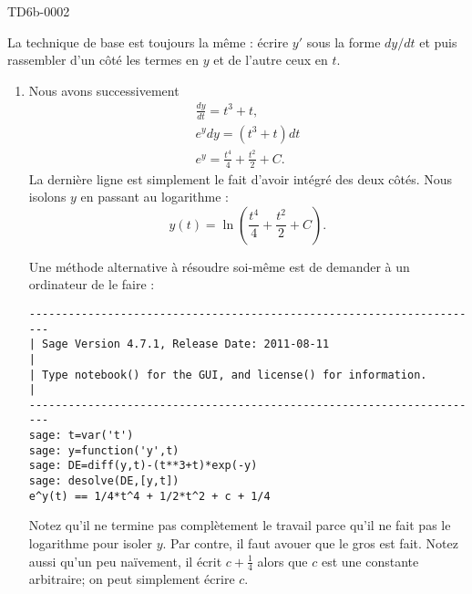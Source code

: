 
\begin{corrige}{TD6b-0002}

    La technique de base est toujours la même : écrire \( y'\) sous la forme \( dy/dt\) et puis rassembler d'un côté les termes en \( y\) et de l'autre ceux en \( t\).

    \begin{enumerate}
        \item
            

            Nous avons successivement
            \begin{subequations}
                \begin{align}
                    \frac{ dy }{ dt }=t^3+t,\\
                    e^ydy=(t^3+t)dt\\
                    e^y=\frac{ t^4 }{ 4 }+\frac{ t^2 }{2}+C.
                \end{align}
            \end{subequations}
            La dernière ligne est simplement le fait d'avoir intégré des deux côtés. Nous isolons \( y\) en passant au logarithme :
            \begin{equation}
                y(t)=\ln\left( \frac{ t^4 }{ 4 }+\frac{ t^2 }{2}+C \right).
            \end{equation}


            Une méthode alternative à résoudre soi-même est de demander à un ordinateur de le faire :
            \begin{verbatim}
----------------------------------------------------------------------
| Sage Version 4.7.1, Release Date: 2011-08-11                       |
| Type notebook() for the GUI, and license() for information.        |
----------------------------------------------------------------------
sage: t=var('t')
sage: y=function('y',t)
sage: DE=diff(y,t)-(t**3+t)*exp(-y)
sage: desolve(DE,[y,t])
e^y(t) == 1/4*t^4 + 1/2*t^2 + c + 1/4            
            \end{verbatim}

            Notez qu'il ne termine pas complètement le travail parce qu'il ne fait pas le logarithme pour isoler \( y\). Par contre, il faut avouer que le gros est fait. Notez aussi qu'un peu naïvement, il écrit \( c+\frac{1}{ 4 }\) alors que \( c\) est une constante arbitraire; on peut simplement écrire \( c\).


\end{enumerate}
\end{corrige}
